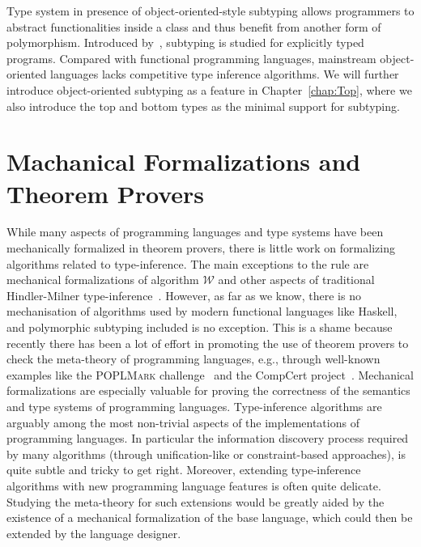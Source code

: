 Type system in presence of object-oriented-style subtyping allows
programmers to abstract functionalities inside a class
and thus benefit from another form of polymorphism.
Introduced by~\citet{Mitchell1984,Reynolds1985,Cardelli1988},
subtyping is studied for explicitly typed programs.
Compared with functional programming languages,
mainstream object-oriented languages lacks competitive type inference algorithms.
We will further introduce object-oriented subtyping as a feature in Chapter~\ref{chap:Top},
where we also introduce the top and bottom types as the minimal support for subtyping.

\section{Machanical Formalizations and Theorem Provers}

While many aspects of programming languages and type systems
have been mechanically formalized in theorem provers, there is little work on
formalizing algorithms related to type-inference. The main exceptions to the rule
are mechanical formalizations of algorithm $\mathcal{W}$ and other aspects
of traditional Hindler-Milner 
type-inference~\citep{naraschewski1999type,dubois2000proving,
dubois1999certification,urban2008nominal,garrigue2015certified}.
However, as far as we know, there is no mechanisation of algorithms 
used by modern functional languages like Haskell, and
polymorphic subtyping included is no exception.  
This is a shame because recently there has been a lot of effort
in promoting the use of theorem provers to check the meta-theory 
of programming languages, e.g., through well-known examples like the \textsc{POPLMark} challenge~\citep{aydemir2005mechanized} and the CompCert project~\citep{leroy2012compcert}.
Mechanical formalizations are especially valuable for proving the
correctness of the semantics and type systems 
of programming languages. Type-inference algorithms are arguably among
the most non-trivial aspects of the implementations of programming
languages. In particular the information discovery process required by 
many algorithms (through unification-like or constraint-based
approaches), is quite subtle and tricky to get right. Moreover,
extending type-inference algorithms with new programming language features is often quite 
delicate. Studying the meta-theory for such extensions would be
greatly aided by the existence of a mechanical
formalization of the base language, which could then be extended by
the language designer.

